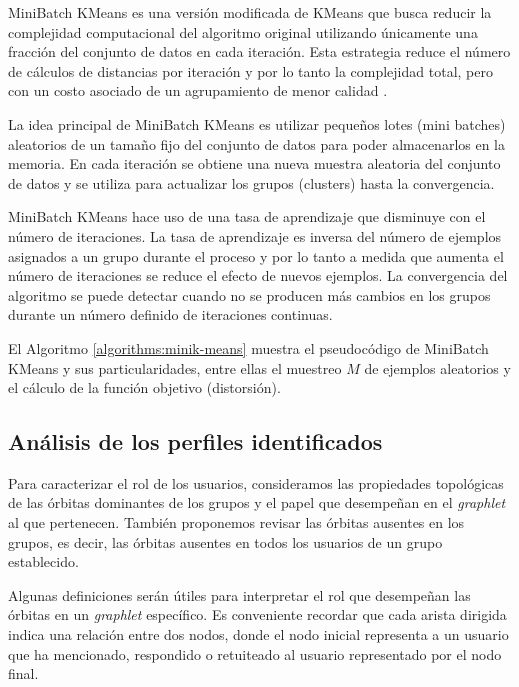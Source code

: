 MiniBatch KMeans \cite{sculley_web-scale_2010} es una versión modificada de KMeans que busca reducir la complejidad computacional del algoritmo original utilizando únicamente una fracción del conjunto de datos en cada iteración. Esta estrategia reduce el número de cálculos de distancias por iteración y por lo tanto la complejidad total, pero con un costo asociado de un agrupamiento de menor calidad \cite{bejar_k-means_nodate}.

La idea principal de MiniBatch KMeans es utilizar pequeños lotes (mini batches) aleatorios de un tamaño fijo del conjunto de datos para poder almacenarlos en la memoria. En cada iteración se obtiene una nueva muestra aleatoria del conjunto de datos y se utiliza para actualizar los grupos (clusters) hasta la convergencia. 

MiniBatch KMeans hace uso de una tasa de aprendizaje que disminuye con el número de iteraciones. La tasa de aprendizaje es inversa del número de ejemplos asignados a un grupo durante el proceso y por lo tanto a medida que aumenta el número de iteraciones se reduce el efecto de nuevos ejemplos. La convergencia del algoritmo se puede detectar cuando no se producen más cambios en los grupos durante un número definido de iteraciones continuas. 

El Algoritmo \ref{algorithms:minik-means} muestra el pseudocódigo de MiniBatch KMeans y sus particularidades, entre ellas el muestreo $M$ de ejemplos aleatorios y el cálculo de la función objetivo (distorsión).

\label{algorithms:minik-means}

\subsection{Análisis de los perfiles identificados}

Para caracterizar el rol de los usuarios, consideramos las propiedades topológicas de las órbitas dominantes de los grupos y el papel que desempeñan en el \textit{graphlet} al que pertenecen. También proponemos revisar las órbitas ausentes en los grupos, es decir, las órbitas ausentes en todos los usuarios de un grupo establecido.

Algunas definiciones serán útiles para interpretar el rol que desempeñan las órbitas en un \textit{graphlet} específico. Es conveniente recordar que cada arista dirigida indica una relación entre dos nodos, donde el nodo inicial representa a un usuario que ha mencionado, respondido o retuiteado al usuario representado por el nodo final. 

